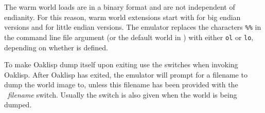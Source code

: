 The warm world loads are in a binary format and are not independent
of endianity.  For this reason, warm world extensions start with
 for big endian versions and  for little endian
versions.  The emulator replaces the characters \texttt{\%\%} in the
command line file argument (or the default world in )
with either \texttt{ol} or \texttt{lo}, depending on whether
 is defined.

To make Oaklisp dump itself upon exiting use the  
switches when invoking Oaklisp.  After Oaklisp has exited, the
emulator will prompt for a filename to dump the world image to, unless
this filename has been provided with the ~\emph{filename}
switch.  Usually the  switch is also given when the world is
being dumped.
